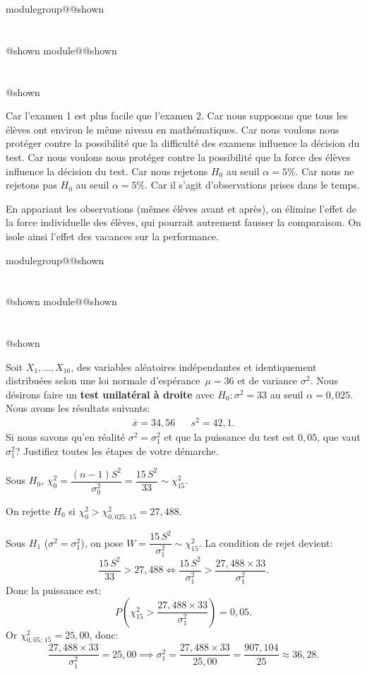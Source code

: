 \documentclass{Evaluation}
\makeatletter
\newcommand{\currentmodulekey}{}
\newcommand{\currentmoduletitle}{}
\newcommand{\currentgroupkey}{}
\newcommand{\currentgrouptitle}{}
\newcommand{\showmoduleifneeded}{%
  \ifx\currentgroupkey\empty\else
    \expandafter\ifx\csname modulegroup@\currentgroupkey @shown\endcsname\relax
      \section*{\currentgrouptitle}%
      \expandafter\gdef\csname modulegroup@\currentgroupkey @shown\endcsname{1}%
    \fi
  \fi
  \expandafter\ifx\csname module@\currentmodulekey @shown\endcsname\relax
    \section*{\currentmoduletitle}%
    \expandafter\gdef\csname module@\currentmodulekey @shown\endcsname{1}%
  \fi
}
\newenvironment{A24}{\showmoduleifneeded}{}
\makeatother
\begin{document}
\begin{questions}
\begin{A24}
\begin{parts}
     \begin{checkboxes}
        \choice Car l'examen 1 est plus facile que l'examen 2.
        \choice Car nous supposons que tous les élèves ont environ le même niveau en mathématiques.
        \choice Car nous voulons nous protéger contre la possibilité que la difficulté des examens influence la décision du test.
        \correctchoice Car nous voulons nous protéger contre la possibilité que la force des élèves influence la décision du test.
        \choice Car nous rejetons $H_0$ au seuil $\alpha=5\%$.
        \choice Car nous ne rejetons pas $H_0$ au seuil $\alpha=5\%$.
        \choice Car il s'agit d'observations prises dans le temps.

    \end{checkboxes}

\begin{solution}
En appariant les observations (mêmes élèves avant et après), on élimine l'effet de la force individuelle des élèves, qui pourrait autrement fausser la comparaison. On isole ainsi l'effet des vacances sur la performance.
\end{solution}

\end{parts}
\end{A24}

\begin{A24}
\question {} %
Soit $X_1,\hdots, X_{16}$, des variables aléatoires indépendantes et identiquement distribuées selon une loi normale d'espérance~$\mu=36$ et de variance $\sigma^2$.
Nous désirons faire un \textbf{test unilatéral à droite} avec $H_0:\sigma^2=33$ au seuil $\alpha = 0,025$.
Nous avons les résultats suivants:
\begin{align*}
    \overline{x}= 34,56 &  & s^2=42,1.
\end{align*}
Si nous savons qu'en réalité $\sigma^2=\sigma^2_1$ et que la puissance du test est $0,05$, que vaut $\sigma^2_1$?  Justifiez toutes les étapes de votre démarche.

\begin{solution}
Sous $H_0$, $\chi_0^2 = \dfrac{(n-1)S^2}{\sigma_0^2} = \dfrac{15\,S^2}{33} \sim \chi^2_{15}$.

On rejette $H_0$ si $\chi_0^2 > \chi^2_{0{,}025;\,15} = 27{,}488$.

Sous $H_1$ ($\sigma^2 = \sigma_1^2$), on pose $W = \dfrac{15\,S^2}{\sigma_1^2} \sim \chi^2_{15}$. La condition de rejet devient:
\[
\frac{15\,S^2}{33} > 27{,}488 \iff \frac{15\,S^2}{\sigma_1^2} > \frac{27{,}488 \times 33}{\sigma_1^2}.
\]
Donc la puissance est:
\[
P\!\left(\chi^2_{15} > \frac{27{,}488 \times 33}{\sigma_1^2}\right) = 0{,}05.
\]
Or $\chi^2_{0{,}05;\,15} = 25{,}00$, donc:
\[
\frac{27{,}488 \times 33}{\sigma_1^2} = 25{,}00 \implies \sigma_1^2 = \frac{27{,}488 \times 33}{25{,}00} = \frac{907{,}104}{25} \approx 36{,}28.
\]
\end{solution}
\end{A24}


\end{questions}
\end{document}
